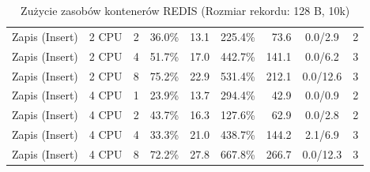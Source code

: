 \begin{table}[ht]
{\begin{tabular}{llcrrrrcc}
Zapis (Insert) & 2 CPU & 2 & 36.0\% & 13.1 & 225.4\% & 73.6 & 0.0/2.9 & 2 \\
Zapis (Insert) & 2 CPU & 4 & 51.7\% & 17.0 & 442.7\% & 141.1 & 0.0/6.2 & 3 \\
Zapis (Insert) & 2 CPU & 8 & 75.2\% & 22.9 & 531.4\% & 212.1 & 0.0/12.6 & 3 \\
Zapis (Insert) & 4 CPU & 1 & 23.9\% & 13.7 & 294.4\% & 42.9 & 0.0/0.9 & 2 \\
Zapis (Insert) & 4 CPU & 2 & 43.7\% & 16.3 & 127.6\% & 62.9 & 0.0/2.8 & 2 \\
Zapis (Insert) & 4 CPU & 4 & 33.3\% & 21.0 & 438.7\% & 144.2 & 2.1/6.9 & 3 \\
Zapis (Insert) & 4 CPU & 8 & 72.2\% & 27.8 & 667.8\% & 266.7 & 0.0/12.3 & 3 \\
\bottomrule
\end{tabular}%
}
\caption{Zużycie zasobów kontenerów REDIS (Rozmiar rekordu: 128 B, 10k)}
\label{tab:resources_redis_small_10000}
\end{table}
